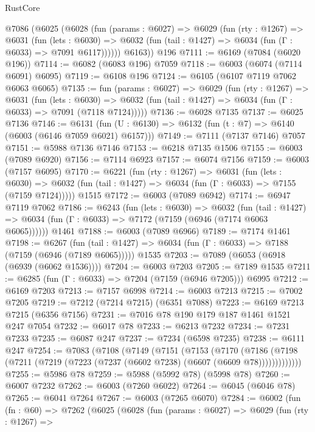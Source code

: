 \begin{lexlean}{RustCore}
\begin{coremodule}
{\begin{coremodule}
{{{{{{{{{{{{{{{{{{{{{{{{{{{{{{{{{{{{{{{{{{{{{{{    @7086
      (@6025
        (@6028
          (fun (params : @6027) =>
          @6029
            (fun (rty : @1267) =>
            @6031
              (fun (lets : @6030) =>
              @6032 (fun (tail : @1427) => @6034 (fun (Γ : @6033) => @7091 @6117))))))
        @6163))
    @196
@7111 := @6169 (@7084 (@6020 @196))
@7114 := @6082 (@6083 @196) @7059
@7118 := @6003 (@6074 (@7114 @6091) @6095)
@7119 := @6108 @196
@7124 := @6105 (@6107 @7119 @7062 @6063 @6065)
@7135 := fun (params : @6027) =>
  @6029
    (fun (rty : @1267) =>
    @6031
      (fun (lets : @6030) =>
      @6032 (fun (tail : @1427) => @6034 (fun (Γ : @6033) => @7091 (@7118 @7124)))))
@7136 := @6028 @7135
@7137 := @6025 @7136
@7146 := @6131 (fun (U : @6130) => @6132 (fun (t : @7) => @6140 (@6003 (@6146 @7059 @6021) @6157)))
@7149 := @7111 (@7137 @7146) @7057
@7151 := @5988 @7136 @7146
@7153 := @6218 @7135 @1506
@7155 := @6003 (@7089 @6920)
@7156 := @7114 @6923
@7157 := @6074 @7156
@7159 := @6003 (@7157 @6095)
@7170 := @6221
    (fun (rty : @1267) =>
    @6031
      (fun (lets : @6030) =>
      @6032 (fun (tail : @1427) => @6034 (fun (Γ : @6033) => @7155 (@7159 @7124)))))
    @1515
@7172 := @6003 (@7089 @6942)
@7174 := @6947 @7119 @7062
@7186 := @6243
    (fun (lets : @6030) =>
    @6032
      (fun (tail : @1427) => @6034 (fun (Γ : @6033) => @7172 (@7159 (@6946 (@7174 @6063 @6065))))))
    @1461
@7188 := @6003 (@7089 @6966)
@7189 := @7174 @1461
@7198 := @6267
    (fun (tail : @1427) => @6034 (fun (Γ : @6033) => @7188 (@7159 (@6946 (@7189 @6065)))))
    @1535
@7203 := @7089 (@6053 (@6918 (@6939 (@6062 @1536))))
@7204 := @6003 @7203
@7205 := @7189 @1535
@7211 := @6285 (fun (Γ : @6033) => @7204 (@7159 (@6946 @7205))) @6995
@7212 := @6169 @7203
@7213 := @7157 @6998
@7214 := @6003 @7213
@7215 := @7002 @7205
@7219 := @7212 (@7214 @7215) (@6351 @7088)
@7223 := @6169 @7213 @7215 (@6356 @7156)
@7231 := @7016 @78 @190 @179 @187 @1461 @1521 @247 @7054
@7232 := @6017 @78
@7233 := @6213 @7232
@7234 := @7231 @7233
@7235 := @6087 @247
@7237 := @7234 (@6598 @7235)
@7238 := @6111 @247
@7254 := @7083
    (@7108
      (@7149
        (@7151
          (@7153
            (@7170
              (@7186 (@7198 (@7211 (@7219 (@7223 (@7237 (@6602 @7238) (@6607 (@6609 @78)))))))))))))
@7255 := @5986 @78
@7259 := @5988 (@5992 @78) (@5998 @78)
@7260 := @6007 @7232
@7262 := @6003 (@7260 @6022)
@7264 := @6045 (@6046 @78)
@7265 := @6041 @7264
@7267 := @6003 (@7265 @6070)
@7284 := @6002
    (fun (fn : @60) =>
    @7262
      (@6025
        (@6028
          (fun (params : @6027) =>
          @6029
            (fun (rty : @1267) =>
}}}}}}}}}}}}}}}}}}}}}}}}}}}}}}}}}}}}}}}}}}}}}}}
\end{coremodule}}
\end{coremodule}
\end{lexlean}

